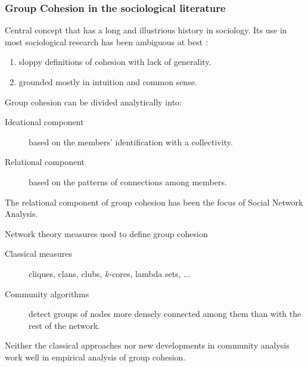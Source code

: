 \documentclass[ignorenonframetext,red,8pt,notes=hide]{beamer}
\begin{document}
\begin{frame}[label=]
\frametitle{Group Cohesion in the sociological literature}

Central concept that has a long and illustrious history in sociology. Its use in most sociological research has been ambiguous at best \citep{moody:2003}: 

\begin{enumerate}

\item sloppy definitions of cohesion with lack of generality.

\item grounded mostly in intuition and common sense.

\end{enumerate}

\begin{block}{Group cohesion \citep{doreian:1998} can be divided analytically into:}

\begin{description}

\item[Ideational component] based on the members' identification with a collectivity.

\item[Relational component] based on the patterns of connections among members.

\end{description}

\end{block}

\pause

The relational component of group cohesion has been the focus of Social Network Analysis.

\begin{block}{Network theory measures used to define group cohesion}

\begin{description}

\item[Classical measures] cliques, clans, clubs, $k$-cores, lambda sets, ...

\item[Community algorithms] detect groups of nodes more densely connected among them than with the rest of the network.

\end{description}

\end{block}

Neither the classical approaches nor new developments in community analysis work well in empirical analysis of group cohesion.

\end{frame}
\end{document}

